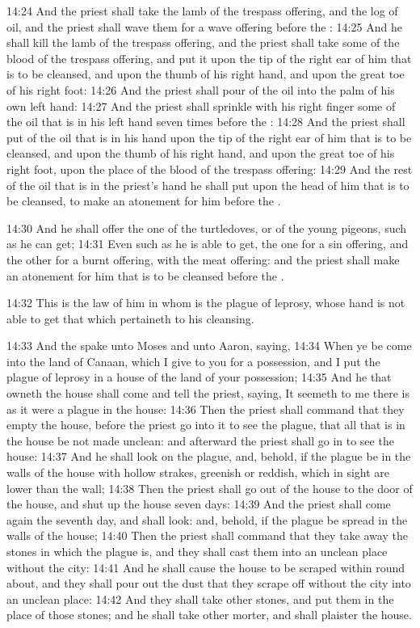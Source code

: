14:24 And the priest shall take the lamb of the trespass offering, and
the log of oil, and the priest shall wave them for a wave offering
before the \LORD: 14:25 And he shall kill the lamb of the trespass
offering, and the priest shall take some of the blood of the trespass
offering, and put it upon the tip of the right ear of him that is to
be cleansed, and upon the thumb of his right hand, and upon the great
toe of his right foot: 14:26 And the priest shall pour of the oil into
the palm of his own left hand: 14:27 And the priest shall sprinkle
with his right finger some of the oil that is in his left hand seven
times before the \LORD: 14:28 And the priest shall put of the oil that
is in his hand upon the tip of the right ear of him that is to be
cleansed, and upon the thumb of his right hand, and upon the great toe
of his right foot, upon the place of the blood of the trespass
offering: 14:29 And the rest of the oil that is in the priest's hand
he shall put upon the head of him that is to be cleansed, to make an
atonement for him before the \LORD.

14:30 And he shall offer the one of the turtledoves, or of the young
pigeons, such as he can get; 14:31 Even such as he is able to get, the
one for a sin offering, and the other for a burnt offering, with the
meat offering: and the priest shall make an atonement for him that is
to be cleansed before the \LORD.

14:32 This is the law of him in whom is the plague of leprosy, whose
hand is not able to get that which pertaineth to his cleansing.

14:33 And the \LORD spake unto Moses and unto Aaron, saying, 14:34 When
ye be come into the land of Canaan, which I give to you for a
possession, and I put the plague of leprosy in a house of the land of
your possession; 14:35 And he that owneth the house shall come and
tell the priest, saying, It seemeth to me there is as it were a plague
in the house: 14:36 Then the priest shall command that they empty the
house, before the priest go into it to see the plague, that all that
is in the house be not made unclean: and afterward the priest shall go
in to see the house: 14:37 And he shall look on the plague, and,
behold, if the plague be in the walls of the house with hollow
strakes, greenish or reddish, which in sight are lower than the wall;
14:38 Then the priest shall go out of the house to the door of the
house, and shut up the house seven days: 14:39 And the priest shall
come again the seventh day, and shall look: and, behold, if the plague
be spread in the walls of the house; 14:40 Then the priest shall
command that they take away the stones in which the plague is, and
they shall cast them into an unclean place without the city: 14:41 And
he shall cause the house to be scraped within round about, and they
shall pour out the dust that they scrape off without the city into an
unclean place: 14:42 And they shall take other stones, and put them in
the place of those stones; and he shall take other morter, and shall
plaister the house.

